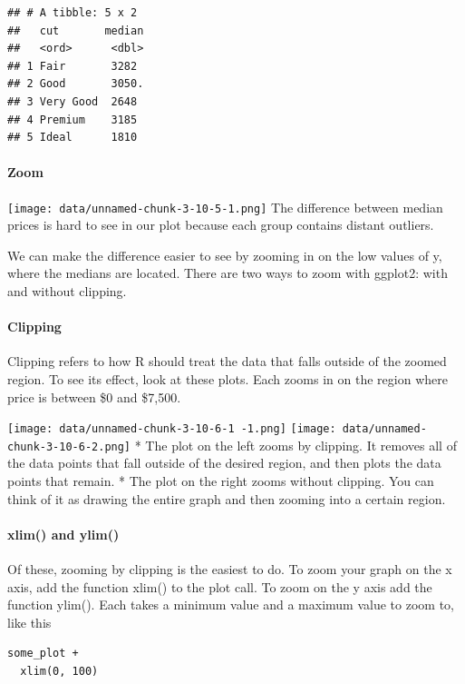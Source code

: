 \documentclass[
]{article}
\begin{document}
\begin{verbatim}
## # A tibble: 5 x 2
##   cut       median
##   <ord>      <dbl>
## 1 Fair       3282 
## 2 Good       3050.
## 3 Very Good  2648 
## 4 Premium    3185 
## 5 Ideal      1810
\end{verbatim}

\hypertarget{zoom}{%
\paragraph{Zoom}\label{zoom}}

\texttt{[image: data/unnamed-chunk-3-10-5-1.png]} The difference between
median prices is hard to see in our plot because each group contains
distant outliers.

We can make the difference easier to see by zooming in on the low values
of y, where the medians are located. There are two ways to zoom with
ggplot2: with and without clipping.

\hypertarget{clipping}{%
\paragraph{Clipping}\label{clipping}}

Clipping refers to how R should treat the data that falls outside of the
zoomed region. To see its effect, look at these plots. Each zooms in on
the region where price is between \$0 and \$7,500.

\texttt{[image: data/unnamed-chunk-3-10-6-1 -1.png]}
\texttt{[image: data/unnamed-chunk-3-10-6-2.png]} * The plot on the left
zooms by clipping. It removes all of the data points that fall outside
of the desired region, and then plots the data points that remain. * The
plot on the right zooms without clipping. You can think of it as drawing
the entire graph and then zooming into a certain region.

\hypertarget{xlim-and-ylim}{%
\paragraph{xlim() and ylim()}\label{xlim-and-ylim}}

Of these, zooming by clipping is the easiest to do. To zoom your graph
on the x axis, add the function xlim() to the plot call. To zoom on the
y axis add the function ylim(). Each takes a minimum value and a maximum
value to zoom to, like this

\begin{verbatim}
some_plot +
  xlim(0, 100)
\end{verbatim}
\end{document}
